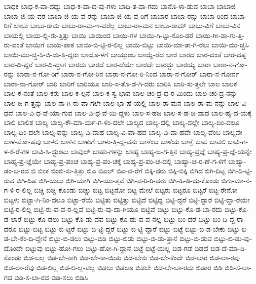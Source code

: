 {ಬಾಧಕ
ಬಾಧ-ಕ-ವಾ-ದದ್ದು
ಬಾಧ-ಕ-ವಾ-ದ-ವು-ಗಳು
ಬಾಧಿ-ತ-ವಾ-ಗದು
ಬಾನೊ-ಳಾ-ಡುವ
ಬಾಬಾ
ಬಾಬಾಜಿ
ಬಾಬಾ-ಜಿ-ಯ-ವರ
ಬಾಬಾ-ಜಿ-ಯ-ವ-ರನ್ನು
ಬಾಬಾ-ಜಿ-ಯ-ವ-ರಿಗೆ
ಬಾಬಾರ
ಬಾಬಾ-ರನ್ನು
ಬಾಬಾ-ರಿಂದ
ಬಾಬಾ-ರಿಗೆ
ಬಾಬು
ಬಾಬು-ರಾಮ
ಬಾಬು-ರಾ-ಮ-ಇ-ವರೆಲ್ಲ
ಬಾಬು-ರಾ-ಮನ
ಬಾಬು-ರಾಮ್
ಬಾಬು-ವಿಗೆ
ಬಾಬು-ವಿನ
ಬಾಯಲ್ಲಿ
ಬಾಯ-ಲ್ಲಿ-ರು-ತ್ತಿತ್ತು
ಬಾಯಿ
ಬಾಯಿಂದ
ಬಾಯಿ-ಗಳ
ಬಾಯಿ-ಗಿ-ಟ್ಟು-ಕೊಂ-ಡರೆ
ಬಾಯಿ-ಗೀ-ಡಾ-ಗು-ತ್ತಿ-ರು-ವಂತೆ
ಬಾಯಿಗೆ
ಬಾಯಿ-ಪಾಠ
ಬಾಯಿ-ಬಿ-ಟ್ಟಿ-ರ-ಲಿಲ್ಲ
ಬಾಯಿ-ಬಿಟ್ಟು
ಬಾಯಿ-ಮಾ-ತಾ-ಗಿ-ರಲು
ಬಾಯಿ-ಮು-ಚ್ಚಿಸಿ
ಬಾಯಿ-ಮು-ಚ್ಚಿ-ಸಿ-ಬಿ-ಡು-ತ್ತಿ-ದ್ದರು
ಬಾಯೊ-ಳಗೆ
ಬಾಯ್ತುಂಬ
ಬಾಯ್ದೆ-ರೆದ
ಬಾರ
ಬಾರದ
ಬಾರ-ದಂತೆ
ಬಾರ-ದಪ್ಪ
ಬಾರ-ದಿ-ದ್ದರೆ
ಬಾರ-ದಿ-ದ್ದಾಗ
ಬಾರದು
ಬಾರದೆ
ಬಾರ-ದೆಯೇ
ಬಾರದೇ
ಬಾರದ್ದು
ಬಾರಯ್ಯ
ಬಾರಾ
ಬಾರಾ-ನ-ಗೋ-ರನ್ನು
ಬಾರಾ-ನ-ಗೋ-ರಿಗೆ
ಬಾರಾ-ನ-ಗೋ-ರಿನ
ಬಾರಾ-ನ-ಗೋ-ರಿ-ನಿಂದ
ಬಾರಾ-ನ-ಗೋರ್
ಬಾರಾ-ನ-ಗೋರ್ನ
ಬಾರಾ-ನಾ-ಗೋರ್
ಬಾರಿ
ಬಾರಿಗೆ
ಬಾರಿಯೂ
ಬಾರಿ-ಸ-ತೊ-ಡ-ಗಿ-ದರು
ಬಾರಿಸಿ
ಬಾರಿ-ಸು-ತ್ತಲೇ
ಬಾಲ
ಬಾಲಕ
ಬಾಲ-ಕ-ನಂತೆ
ಬಾಲ-ಕರು
ಬಾಲ-ಕ-ಲ್ಪನೆ
ಬಾಲ-ಕ-ಸ್ವ-ಭಾವ
ಬಾಲ-ಚಂ-ದ್ರ-ಧ-ರ-ಮಿಂದು
ಬಾಲ-ಚಂ-ದ್ರ-ನನ್ನು
ಬಾಲ-ಜ-ಗ-ತ್ತನ್ನು
ಬಾಲ-ನಾ-ಗಿ-ರು-ವಾ-ಗಲೇ
ಬಾಲ-ಭಾ-ಷೆ-ಯಲ್ಲಿ
ಬಾಲ-ರಾ-ಮನ
ಬಾಲ-ರಾ-ಮ-ನನ್ನು
ಬಾಲ-ವಿ-ಧವೆ
ಬಾಲ-ವಿ-ಧ-ವೆ-ಯಾ-ಗುವ
ಬಾಲ-ವಿ-ಧ-ವೆ-ಯಿ-ದ್ದಳು
ಬಾಲ-ಸ-ಹಜ
ಬಾಲ-ಸ-ಹ-ಜ-ವಾದ
ಬಾಲ-ಹೃ-ದ-ಯಕ್ಕೆ
ಬಾಲಿ
ಬಾಲಿಶ
ಬಾಲ್ಯ
ಬಾಲ್ಯ-ಕೌ-ಮಾ-ರ್ಯ-ಗ-ಳಿಂ-ದಲೇ
ಬಾಲ್ಯದ
ಬಾಲ್ಯ-ದಲ್ಲಿ
ಬಾಲ್ಯ-ದಲ್ಲೇ
ಬಾಲ್ಯ-ದಿಂ-ದಲೂ
ಬಾಲ್ಯ-ದಿಂ-ದಲೇ
ಬಾಲ್ಯ-ವನ್ನು
ಬಾಲ್ಯ-ವಿ-ವಾಹ
ಬಾಲ್ಯ-ವಿ-ವಾ-ಹದ
ಬಾಲ್ಯ-ವಿ-ವಾ-ಹವೇ
ಬಾಲ್ಯ-ವೆಂಬ
ಬಾಲ್ಯವೇ
ಬಾಳ-ಮೋ-ಹವು
ಬಾಳಲಿ
ಬಾಳಿನ
ಬಾಳುಗೆ
ಬಾಳು-ತ್ತಿ-ದ್ದ-ವನು
ಬಾಳೆಂಬ
ಬಾಳೆಯ
ಬಾಳ್ವೆ
ಬಾವ
ಬಾವಲಿ
ಬಾವಿ-ಗ-ಳ-ಕೆ-ರೆ-ಗಳ
ಬಾವಿ-ಸಿ-ದ್ದುಂಟು
ಬಾವುಲ್
ಬಾಹು-ಗಳನ್ನು
ಬಾಹ್ಯ
ಬಾಹ್ಯ-ಜ-ಗ-ತ್ತಿನ
ಬಾಹ್ಯ-ಪ್ರಜ್ಞೆ
ಬಾಹ್ಯ-ಪ್ರ-ಜ್ಞೆ-ಯನ್ನೇ
ಬಾಹ್ಯ-ಪ್ರ-ಜ್ಞೆಯೇ
ಬಾಹ್ಯ-ಪ್ರ-ಪಂಚ
ಬಾಹ್ಯ-ಪ್ರ-ಪಂ-ಚಕ್ಕೆ
ಬಾಹ್ಯ-ಪ್ರ-ಪಂ-ಚ-ದಲ್ಲಿ
ಬಾಹ್ಯಾ-ಚ-ರ-ಣೆ-ಗ-ಳಿಗೆ
ಬಾಹ್ಯಾ-ಡಂ-ಬ-ರದ
ಬಿ
ಬಿಂಕ
ಬಿಂಬಿ-ಸು-ತ್ತಿತ್ತು
ಬಿಎ
ಬಿಎಲ್
ಬಿಎ-ವ-ರೆಗೆ
ಬಿಕ್ಕಿ-ದರು
ಬಿಕ್ಕಿ-ಬಿಕ್ಕಿ
ಬಿಗಿದ
ಬಿಗಿ-ದಿಟ್ಟ
ಬಿಗಿ-ದಿ-ಟ್ಟಿ-ರುವ
ಬಿಗಿ-ದಿಹ
ಬಿಗಿ-ಯಲು
ಬಿಗಿ-ಯಾಗಿ
ಬಿಗಿ-ಯು-ತ್ತವೆ
ಬಿಗಿ-ವ-ರಿ-ರಿ-ವರು
ಬಿಗಿ-ಹಿ-ಡಿ-ದು-ಕೊಂಡು
ಬಿಗು-ಮಾ-ನ-ಗ-ಳಿ-ರ-ಲಿಲ್ಲ
ಬಿಚ್ಚಿ
ಬಿಚ್ಚಿ-ಕೊಂಡು
ಬಿಚ್ಚು
ಬಿಟ್ಟ
ಬಿಟ್ಟನೋ
ಬಿಟ್ಟ-ಮೇಲೆ
ಬಿಟ್ಟರು
ಬಿಟ್ಟರೂ
ಬಿಟ್ಟರೆ
ಬಿಟ್ಟ-ರೇನೋ
ಬಿಟ್ಟಳು
ಬಿಟ್ಟಾ-ಗಿ-ನಿಂ-ದಲೂ
ಬಿಟ್ಟಾ-ರೆಯೆ
ಬಿಟ್ಟಿತು
ಬಿಟ್ಟಿತ್ತು
ಬಿಟ್ಟಿದೆ
ಬಿಟ್ಟಿದ್ದ
ಬಿಟ್ಟಿ-ದ್ದರೆ
ಬಿಟ್ಟಿ-ದ್ದಾರೆ
ಬಿಟ್ಟಿ-ದ್ದಾ-ರೆಯೇ
ಬಿಟ್ಟಿ-ರ-ಲಿಲ್ಲ
ಬಿಟ್ಟಿ-ರು-ವ-ವ-ರ-ಲ್ಲವೆ
ಬಿಟ್ಟಿ-ರು-ವು-ದಾ-ಗಿಯೂ
ಬಿಟ್ಟಿವೆ
ಬಿಟ್ಟು
ಬಿಟ್ಟು-ಕೊ-ಡ-ಬಾ-ರದು
ಬಿಟ್ಟು-ಕೊ-ಡ-ಲಾರೆ
ಬಿಟ್ಟು-ಕೊ-ಡಲು
ಬಿಟ್ಟು-ಕೊ-ಡು-ವವ
ಬಿಟ್ಟು-ಕೊ-ಡು-ವ-ವ-ನಲ್ಲ
ಬಿಟ್ಟು-ಬಂ-ದರೆ
ಬಿಟ್ಟು-ಬಂ-ದಿ-ದ್ದ-ರಾ-ದರೂ
ಬಿಟ್ಟು-ಬಿಟ್ಟ
ಬಿಟ್ಟು-ಬಿ-ಟ್ಟರೆ
ಬಿಟ್ಟು-ಬಿ-ಟ್ಟಿ-ದ್ದರೆ
ಬಿಟ್ಟು-ಬಿ-ಟ್ಟಿ-ದ್ದಾರೆ
ಬಿಟ್ಟು-ಬಿಟ್ಟೆ
ಬಿಟ್ಟು-ಬಿ-ಡ-ಬೇಕು
ಬಿಟ್ಟು-ಬಿ-ಡ-ಬೇ-ಕೆಂ-ದಿ-ದ್ದೇನೆ
ಬಿಟ್ಟು-ಬಿ-ಡಲು
ಬಿಟ್ಟು-ಬಿಡಿ
ಬಿಟ್ಟು-ಬಿಡು
ಬಿಟ್ಟು-ಬಿ-ಡು-ತ್ತಾನೆ
ಬಿಟ್ಟು-ಬಿ-ಡುವ
ಬಿಟ್ಟು-ಬಿ-ಡು-ವು-ದೊಂದೇ
ಬಿಟ್ಟುವು
ಬಿಟ್ಟು-ಹೋ-ಗಲು
ಬಿಟ್ಟು-ಹೋ-ಗಿ-ದ್ದಾನೆ
ಬಿಟ್ಟೆ
ಬಿಟ್ಟೆ-ಯಲ್ಲ
ಬಿಡ-ಗಡೆ
ಬಿಡದೆ
ಬಿಡ-ದೆ-ಮಾ-ಡಿ-ಕೊಂಡು
ಬಿಡ-ಬಲ್ಲ
ಬಿಡ-ಬೇ-ಕಾಗಿ
ಬಿಡ-ಬೇ-ಕಾ-ಯಿತು
ಬಿಡ-ಬೇಕು
ಬಿಡ-ಬೇ-ಕೆಂದೇ
ಬಿಡ-ಲಾರ
ಬಿಡ-ಲಾ-ರವು
ಬಿಡ-ಲಾ-ರೆವು
ಬಿಡ-ಲಿಲ್ಲ
ಬಿಡ-ಲಿ-ಲ್ಲ-ವಲ್ಲ
ಬಿಡಲು
ಬಿಡಲೂ
ಬಿಡಲೇ
ಬಿಡ-ಲೇ-ಬಾ-ರದು
ಬಿಡಾರ
ಬಿಡಿ
ಬಿಡಿ-ಸ-ಲಾ-ಗದ
ಬಿಡಿ-ಸ-ಲಾ-ರದ
ಬಿಡಿ-ಸಲು
ಬಿಡಿಸಿ
}

